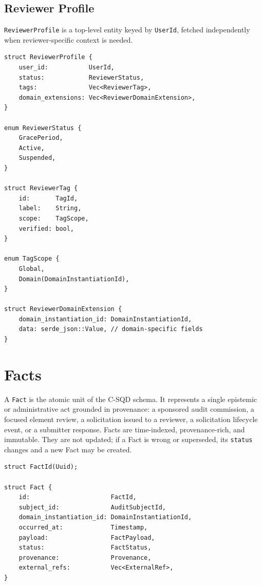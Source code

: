 \documentclass[11pt]{article}
\begin{document}
\subsection{Reviewer Profile}

\texttt{ReviewerProfile} is a top-level entity keyed by \texttt{UserId},
fetched independently when reviewer-specific context is needed.

\begin{lstlisting}
struct ReviewerProfile {
    user_id:           UserId,
    status:            ReviewerStatus,
    tags:              Vec<ReviewerTag>,
    domain_extensions: Vec<ReviewerDomainExtension>,
}

enum ReviewerStatus {
    GracePeriod,
    Active,
    Suspended,
}

struct ReviewerTag {
    id:       TagId,
    label:    String,
    scope:    TagScope,
    verified: bool,
}

enum TagScope {
    Global,
    Domain(DomainInstantiationId),
}

struct ReviewerDomainExtension {
    domain_instantiation_id: DomainInstantiationId,
    data: serde_json::Value, // domain-specific fields
}
\end{lstlisting}

\section{Facts}

A \texttt{Fact} is the atomic unit of the C-SQD schema. It represents a single
epistemic or administrative act grounded in provenance: a sponsored audit
commission, a focused element review, a solicitation issued to a reviewer, a
solicitation lifecycle event, or a submitter response. Facts are time-indexed,
provenance-rich, and immutable. They are not updated; if a Fact is wrong or
superseded, its \texttt{status} changes and a new Fact may be created.

\begin{lstlisting}
struct FactId(Uuid);

struct Fact {
    id:                      FactId,
    subject_id:              AuditSubjectId,
    domain_instantiation_id: DomainInstantiationId,
    occurred_at:             Timestamp,
    payload:                 FactPayload,
    status:                  FactStatus,
    provenance:              Provenance,
    external_refs:           Vec<ExternalRef>,
}
\end{lstlisting}
\end{document}
